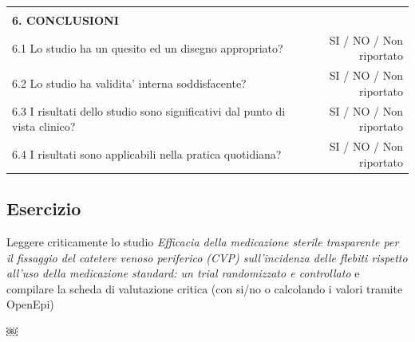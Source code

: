 \documentclass[]{book}
\begin{document}
\begin{longtable}[]{@{}lr@{}}
\begin{minipage}[t]{0.47\columnwidth}\raggedright
\strut
\end{minipage} & \begin{minipage}[t]{0.47\columnwidth}\raggedleft
\strut
\end{minipage}\tabularnewline
\begin{minipage}[t]{0.47\columnwidth}\raggedright
\textbf{6. CONCLUSIONI}\strut
\end{minipage} & \begin{minipage}[t]{0.47\columnwidth}\raggedleft
\strut
\end{minipage}\tabularnewline
\begin{minipage}[t]{0.47\columnwidth}\raggedright
6.1 Lo studio ha un quesito ed un disegno appropriato?\strut
\end{minipage} & \begin{minipage}[t]{0.47\columnwidth}\raggedleft
SI / NO / Non riportato\strut
\end{minipage}\tabularnewline
\begin{minipage}[t]{0.47\columnwidth}\raggedright
6.2 Lo studio ha validita' interna soddisfacente?\strut
\end{minipage} & \begin{minipage}[t]{0.47\columnwidth}\raggedleft
SI / NO / Non riportato\strut
\end{minipage}\tabularnewline
\begin{minipage}[t]{0.47\columnwidth}\raggedright
6.3 I risultati dello studio sono significativi dal punto di vista clinico?\strut
\end{minipage} & \begin{minipage}[t]{0.47\columnwidth}\raggedleft
SI / NO / Non riportato\strut
\end{minipage}\tabularnewline
\begin{minipage}[t]{0.47\columnwidth}\raggedright
6.4 I risultati sono applicabili nella pratica quotidiana?\strut
\end{minipage} & \begin{minipage}[t]{0.47\columnwidth}\raggedleft
SI / NO / Non riportato\strut
\end{minipage}\tabularnewline
\bottomrule
\end{longtable}

\hypertarget{esercizio-2}{%
\subsection{Esercizio}\label{esercizio-2}}

Leggere criticamente lo studio \emph{Efficacia della medicazione sterile trasparente per il fissaggio del catetere venoso periferico (CVP) sull'incidenza delle flebiti rispetto all'uso della medicazione standard: un trial randomizzato e controllato} e compilare la scheda di valutazione critica (con si/no o calcolando i valori tramite OpenEpi)

￼
\end{document}
